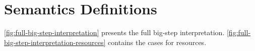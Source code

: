 \section{Semantics Definitions}
\label{sec:semant-defin}

% 




\cref{fig:full-big-step-interpretation} presents  the full big-step
interpretation. \cref{fig:full-big-step-interpretation-resources}
contains the cases for resources.



